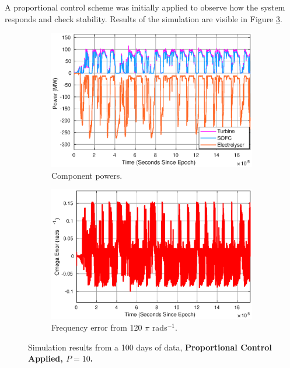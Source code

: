 A proportional control scheme was initially applied to observe how the system responds and check stability.
Results of the simulation are visible in Figure \ref{fig:power-proportional}.

\begin{figure}
\centering
\begin{subfigure}{.5\textwidth}
  \centering
  \includegraphics[width=1\linewidth]{images/results/P/use.eps}
  \caption{Component powers.}
  \label{fig:sub1}
\end{subfigure}%
\begin{subfigure}{.5\textwidth}
  \centering
  \includegraphics[width=1\linewidth]{images/results/P/omega.eps}
  \caption{Frequency error from 120 $\pi$ rads$^{-1}$.}
  \label{fig:sub2}
\end{subfigure}
\caption{Simulation results from a 100 days of data, {\bf Proportional Control Applied, $P=10$.}}
\label{fig:power-proportional}
\end{figure}

